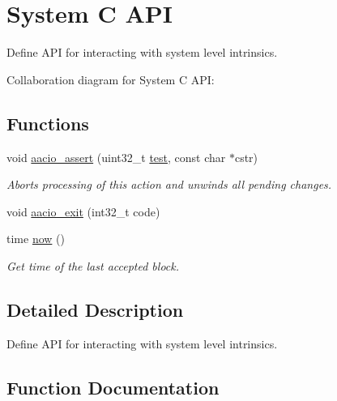 \hypertarget{group__systemcapi}{}\section{System C A\+PI}
\label{group__systemcapi}


Define A\+PI for interacting with system level intrinsics.  


Collaboration diagram for System C A\+PI\+:
\subsection*{Functions}
\begin{DoxyCompactItemize}
\item 
void \mbox{\hyperlink{group__systemcapi_gaf5c36ddbe4ddd977456ac9aefcdb923f}{aacio\+\_\+assert}} (uint32\+\_\+t \mbox{\hyperlink{structtest}{test}}, const char $\ast$cstr)
\begin{DoxyCompactList}\small\item\em Aborts processing of this action and unwinds all pending changes. \end{DoxyCompactList}\item 
void \mbox{\hyperlink{group__systemcapi_ga129383e61d5dcdb54059f55f0ac2e9bc}{aacio\+\_\+exit}} (int32\+\_\+t code)
\item 
time \mbox{\hyperlink{group__systemcapi_ga5eef43c9589d6ef54a0ece1dda5e0ffe}{now}} ()
\begin{DoxyCompactList}\small\item\em Get time of the last accepted block. \end{DoxyCompactList}\end{DoxyCompactItemize}


\subsection{Detailed Description}
Define A\+PI for interacting with system level intrinsics. 



\subsection{Function Documentation}
\mbox{\label{group__systemcapi_gaf5c36ddbe4ddd977456ac9aefcdb923f}} 
